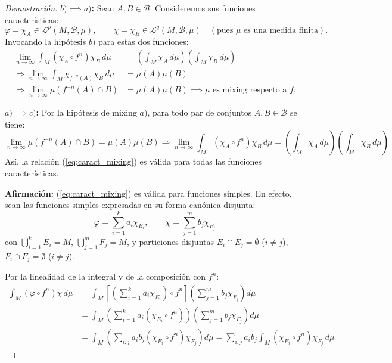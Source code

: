 \begin{proof}[Demostración]
	\textbf{$b) \implies a)$:}
	Sean $A, B \in \mathcal{B}$. Consideremos sus funciones características:
	$$ \varphi = \chi_A \in \mathcal{L}^p(M, \mathcal{B}, \mu), \qquad \chi = \chi_B \in \mathcal{L}^q(M, \mathcal{B}, \mu) \quad (\text{pues } \mu \text{ es una medida finita}). $$
	Invocando la hipótesis $b)$ para estas dos funciones:
	\begin{align*}
		\lim_{n \to \infty} \int_M (\chi_A \circ f^n)\chi_B \, d\mu &= \left( \int_M \chi_A \, d\mu \right) \left( \int_M \chi_B \, d\mu \right) \\
		\Longrightarrow \lim_{n \to \infty} \int_M \chi_{f^{-n}(A)}\chi_B \, d\mu &= \mu(A)\mu(B) \\
		\Longrightarrow \lim_{n \to \infty} \mu(f^{-n}(A) \cap B) &= \mu(A)\mu(B) \implies \mu \text{ es mixing respecto a } f.
	\end{align*}
	
	\textbf{$a) \implies c)$:}
	Por la hipótesis de mixing $a)$, para todo par de conjuntos $A, B \in \mathcal{B}$ se tiene:
	\begin{equation}
		\lim_{n \to \infty} \mu(f^{-n}(A) \cap B) = \mu(A)\mu(B) \Longrightarrow \lim_{n \to \infty} \int_M (\chi_A \circ f^n)\chi_B \, d\mu = \left( \int_M \chi_A \, d\mu \right) \left( \int_M \chi_B \, d\mu \right) \label{eq:caract_mixing}
	\end{equation}
	Así, la relación (\ref{eq:caract_mixing}) es válida para todas las funciones características.
	
	\textbf{Afirmación:} (\ref{eq:caract_mixing}) es válida para funciones simples. En efecto, sean las funciones simples expresadas en su forma canónica disjunta:
	$$ \varphi = \sum_{i=1}^{k} a_i \chi_{E_i}, \qquad \chi = \sum_{j=1}^{m} b_j \chi_{F_j} $$
	con $\bigcup_{i=1}^{k} E_i = M$, $\bigcup_{j=1}^{m} F_j = M$, y particiones disjuntas $E_i \cap E_j = \emptyset$ ($i \neq j$), $F_i \cap F_j = \emptyset$ ($i \neq j$).
	
	Por la linealidad de la integral y de la composición con $f^n$:
	\begin{align*}
		\int_M (\varphi \circ f^n)\chi \, d\mu &= \int_M \left[ \left( \sum_{i=1}^{k} a_i \chi_{E_i} \right) \circ f^n \right] \left( \sum_{j=1}^{m} b_j \chi_{F_j} \right) d\mu \\
		&= \int_M \left( \sum_{i=1}^{k} a_i (\chi_{E_i} \circ f^n) \right) \left( \sum_{j=1}^{m} b_j \chi_{F_j} \right) d\mu \\
		&= \int_M \left( \sum_{i,j} a_i b_j (\chi_{E_i} \circ f^n)\chi_{F_j} \right) d\mu = \sum_{i,j} a_i b_j \int_M (\chi_{E_i} \circ f^n)\chi_{F_j} \, d\mu
	\end{align*}
	

\end{proof}
